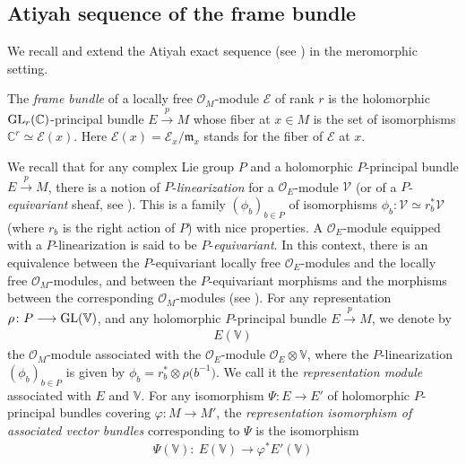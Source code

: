 \documentclass[10pt,a4paper]{amsart}
\numberwithin{equation}{section}
\begin{document}
\subsection{Atiyah sequence of the frame bundle}\label{Atiyahframe}

We recall and extend the Atiyah exact sequence (see \cite[Theorem 1]{Atiyah}) in the meromorphic setting.

The \textit{frame bundle} of a locally free $\mathcal{O}_M$-module $\mathcal{E}$ of rank $r$ is the holomorphic ${\rm GL}_r(\mathbb{C})$-principal bundle $E\overset{p}{\longrightarrow} M$ whose fiber at $x\in M$ is the set of isomorphisms $\mathbb{C}^r \simeq \mathcal{E}(x)$. Here $\mathcal{E}(x)=\mathcal{E}_x /\mathfrak{m}_x$ stands for the fiber of $\mathcal{E}$ at $x$.

We recall that for any complex Lie group $P$ and a holomorphic $P$-principal bundle $E\overset{p}{\longrightarrow} M$, there is a notion of $P$-\textit{linearization} for a $\mathcal{O}_E$-module $\mathcal{V}$ (or of a $P$-\textit{equivariant} sheaf, see \cite[Definition 9.10.3]{Hotta}). This is a family $(\phi_b)_{b\in P}$ of isomorphisms $\phi_b\colon \mathcal{V} \simeq r_b^* \mathcal{V}$ (where $r_b$ is the right action of $P$) with nice properties. A $\mathcal{O}_E$-module equipped with a $P$-linearization is said to be $P$-\textit{equivariant}. In this context, there is an equivalence between the $P$-equivariant locally free $\mathcal{O}_E$-modules and the locally free $\mathcal{O}_M$-modules, and between the $P$-equivariant morphisms and the morphisms between the corresponding $\mathcal{O}_M$-modules (see \cite[Lemma, p.~3]{Lunts}). For any representation $\rho\colon P \longrightarrow {\rm GL}(\mathbb{V})$, and any holomorphic $P$-principal bundle $E\overset{p}{\longrightarrow} M$, we denote by
\begin{gather}\label{representationmodule} E(\mathbb{V})
\end{gather}
 the $\mathcal{O}_M$-module associated with the $\mathcal{O}_E$-module $\mathcal{O}_E \otimes \mathbb{V}$, where the $P$-linearization $(\phi_b)_{b\in P}$ is given by $\phi_b = r_b^* \otimes \rho\big(b^{-1}\big)$. We call it the \textit{representation module} associated with $E$ and $\mathbb{V}$. For any isomorphism $\Psi\colon E\longrightarrow E'$ of holomorphic $P$-principal bundles covering $\varphi\colon M\longrightarrow M'$, the \textit{representation isomorphism of associated vector bundles} corresponding to $\Psi$ is the isomorphism
\begin{gather}\label{representationmorphism} \Psi(\mathbb{V})\colon\ E(\mathbb{V}) \longrightarrow \varphi^* E'(\mathbb{V})
 \end{gather}
\end{document}
